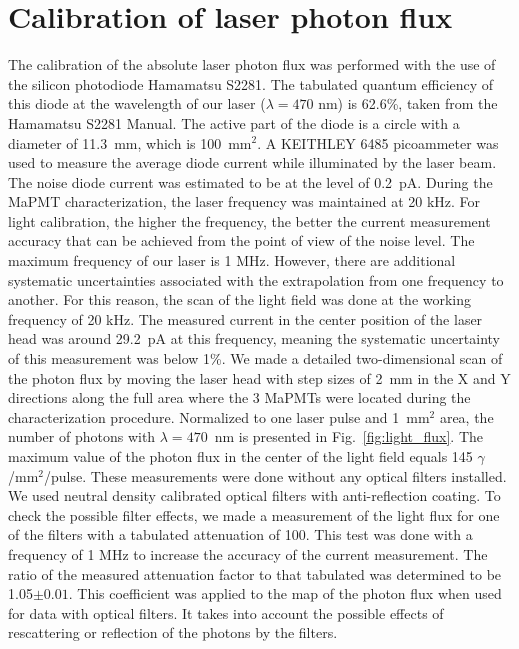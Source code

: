 \section{Calibration of laser photon flux}

The calibration of the absolute laser photon flux was performed with the use of the silicon photodiode Hamamatsu S2281.
The tabulated quantum efficiency of this diode at the wavelength of our laser ($\lambda=470$ nm) is 62.6\%, taken from the Hamamatsu S2281 Manual. 
The active part of the diode is a circle with a diameter of 11.3~mm, which is 100~mm$^2$. 
A KEITHLEY 6485 picoammeter was used to measure the average diode current while illuminated by the laser beam.
The noise diode current was estimated to be at the level of 0.2~pA. 
During the MaPMT characterization, the laser frequency was maintained at 20 kHz. 
For light calibration, the higher the frequency, the better the current measurement accuracy that can be achieved from the point of view of the noise level. 
The maximum frequency of our laser is 1 MHz.
However, there are additional systematic uncertainties associated with the extrapolation from one frequency to another. 
For this reason, the scan of the light field was done at the working frequency of 20 kHz. 
The measured current in the center position of the laser head was around 29.2~pA at this frequency, meaning the systematic uncertainty
of this measurement was below 1\%.  We made a detailed two-dimensional scan of the photon flux by
moving the laser head with step sizes of 2~mm in the X and Y directions along the full area where the 3 MaPMTs were located during the characterization procedure.
Normalized to one laser pulse and 1~mm$^2$ area, the number of photons with $\lambda=470$~nm  is presented in Fig.~\ref{fig:light_flux}.
The maximum value of the photon flux in the center of the light field equals 145 $\gamma$/mm$^2$/pulse.
These measurements were done without  any optical filters installed. We used neutral density calibrated optical filters with anti-reflection coating.
To check the possible filter effects, we made a measurement of the light flux for one of the filters with a tabulated attenuation of 100. 
This test was done with a frequency of 1 MHz to increase the accuracy of the current measurement. 
The ratio of the measured attenuation factor to that tabulated was determined to be 1.05$\pm 0.01$. This coefficient was applied to the map of the photon flux when used for data with optical filters. It takes into account the possible effects of rescattering or reflection of the photons by the filters.
